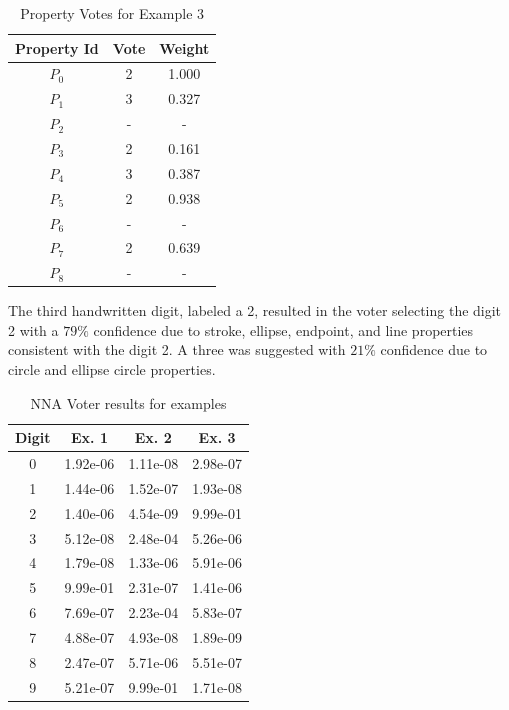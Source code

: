 \documentclass[conference]{IEEEtran}
\begin{document}
\begin{table}[htbp]
\caption{Property Votes for Example 3}
\centering
\begin{tabular}{| c | c | c |}
\hline
 Property Id & Vote & Weight \\
\hline\hline
$P_0$ & 2 & 1.000 \\ 
\hline
$P_1$ & 3 & 0.327 \\
\hline
$P_2$ & - & - \\
\hline
$P_3$ & 2 & 0.161 \\
\hline
$P_4$ & 3 & 0.387 \\
\hline
$P_5$ & 2 & 0.938 \\
\hline
$P_6$ & - & - \\
\hline
$P_7$ & 2 & 0.639 \\
\hline
$P_8$ & - & - \\
\hline
\end{tabular}
\label{table:example3}
\end{table}

The third handwritten digit, labeled a 2, resulted in the voter selecting the digit 2 with a $79\%$ confidence due to stroke, ellipse, endpoint, and line properties consistent with the digit 2.  A three was suggested with $21\%$ confidence due to circle and ellipse circle properties.

\begin{table}[htbp]
\caption{NNA Voter results for examples}
\centering
\begin{tabular}{| c | c | c | c |}
\hline
 Digit & Ex. 1 & Ex. 2 & Ex. 3 \\
\hline\hline
0 & 1.92e-06 & 1.11e-08 & 2.98e-07\\ 
\hline
1 & 1.44e-06 & 1.52e-07 & 1.93e-08 \\
\hline
2 & 1.40e-06 & 4.54e-09 & 9.99e-01 \\
\hline
3 & 5.12e-08 & 2.48e-04 & 5.26e-06 \\
\hline
4 & 1.79e-08 & 1.33e-06 & 5.91e-06 \\
\hline
5 & 9.99e-01 & 2.31e-07 & 1.41e-06 \\
\hline
6 & 7.69e-07 & 2.23e-04 & 5.83e-07 \\
\hline
7 & 4.88e-07 & 4.93e-08 & 1.89e-09 \\
\hline
8 & 2.47e-07 & 5.71e-06 & 5.51e-07 \\
\hline
9 & 5.21e-07 & 9.99e-01 & 1.71e-08 \\
\hline
\end{tabular}
\label{table:nnavoter}
\end{table}
\end{document}

